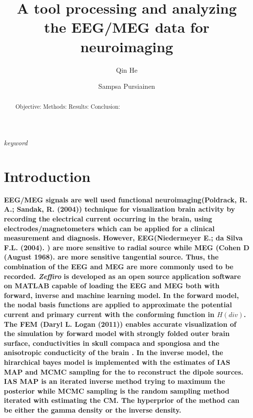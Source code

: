 \documentclass[5p]{elsarticle}
\begin{document}
\begin{frontmatter}
\title{A tool processing and analyzing the EEG/MEG data for neuroimaging}

\author[ADD1,ADD2]{Qin He}
\author[ADD1]{Sampsa Pursiainen}

\address[ADD1]{Laboratory of Mathematics, Tampere University of Technology, P.O.\ Box 692, 33101 Tampere, Finland}
\address[ADD2]{Laboratory of Signal Processing, Tampere University of Technology, Tampere, Finland, P.O.\ Box 553, 33101 Tampere, Finland}


\begin{abstract}
Objective: 
Methods:
Results:
Conclusion:
\end{abstract}

\emph {keyword}


\section{Introduction}
 \bf{EEG/MEG signals are well used functional neuroimaging(Poldrack, R. A.; Sandak, R. (2004))
 technique for visualization brain activity by recording the electrical current occurring  in the brain, using electrodes/magnetometers which  can be applied for a clinical
 measurement and 
 diagnosis. \cite{1}
 However, EEG(Niedermeyer E.; da Silva F.L. (2004). ) are more sensitive to radial source while MEG (Cohen D (August 1968). are more sensitive tangential source\cite{2}. Thus, the combination of the EEG and MEG\cite{3} are more commonly used to be recorded. {\em Zeffiro} is developed as an open source application software on MATLAB capable of loading the EEG and MEG both with forward, inverse and machine learning model. 
 In the forward model, the nodal basis functions are applied to approximate the potential current and primary current with the conforming function in $H(div)$. The FEM (Daryl L. Logan (2011)) enables accurate visualization of the simulation by forward model with strongly folded outer brain surface, conductivities in skull compaca and spongiosa and the anisotropic conducticity of the brain \cite{4,5,6,7,8}. 
 In the inverse model, the hirarchical bayes model is implemented with the estimates of IAS MAP and MCMC sampling for the to reconstruct the dipole sources. IAS MAP\cite{9} is an iterated inverse method trying to maximum the posterior while MCMC sampling\cite{10} is the random sampling method iterated with estimating the CM. The hyperprior of the method can be either the gamma density or the inverse density. 
}
\end{frontmatter}
\end{document}
